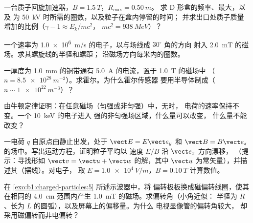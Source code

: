 \begin{exercise}[$\star\star$]\label{exo:b1:charged-particles:7}
一台质子回旋加速器，$B = \qty{1.5}{T}$，$R_{\max} = \qty{0.50}{m}$。
求 D 形盒的频率、最大，以及
为 \qty{50}{kV} 时所需的圈数，以及粒子在盒内停留的时间；
并求出口处质子质量增加的比例（$\gamma - 1 \approx E_k/mc^2$，
$mc^2 = \qty{938}{MeV}$）？
\end{exercise}

\begin{exercise}[$\star\star$]\label{exo:b1:charged-particles:8}
一个速率为 \qty{1.0e6}{m/s} 的电子，以与场线成 $30^\circ$ 角的方向
射入 \qty{2.0}{mT} 的磁场。求其螺旋线的半径和螺距；
沿磁场方向每米内的圈数。
\end{exercise}

\begin{exercise}[$\star\star$]\label{exo:b1:charged-particles:9}
一厚度为 \qty{1.0}{mm} 的铜带通有 \qty{5.0}{A} 的电流，置于 \qty{1.0}{T} 的磁场中
（$n = \qty{8.5e28}{m^{-3}}$）。求霍尔。为什么霍尔传感器
要用半导体制成（$n \sim \qty{1e22}{m^{-3}}$）？
\end{exercise}

\begin{exercise}[$\star\star\star$]\label{exo:b1:charged-particles:10}
由牛顿定律证明：在任意磁场（匀强或非匀强）中，无时，
电荷的速率保持不变。一个 \qty{10}{keV} 的电子进入
强的非匀强场区域，什么量可以改变，
什么量不能改变？
\end{exercise}

\begin{exercise}[$\star\star\star$]\label{exo:b1:charged-particles:11}
一电荷 $q$ 自原点由静止出发，处于 $\vect E = E\vect e_y$ 和
$\vect B = B\vect e_z$ 的场中。写出运动方程，证明粒子平均以
速度 $E/B$ 沿 $\vect e_x$ 方向漂移，
（提示：寻找形如 $\vect v = \vect u + \vect w$ 的解，其中
$\vect u$ 为常矢量），并描述其（摆线）。对电子，
取 $E = \qty{1.0e4}{V/m}$，$B = \qty{0.10}{T}$ 计算数值。
\end{exercise}

\begin{exercise}[$\star\star\star$]\label{exo:b1:charged-particles:12}
在 \cref{exo:b1:charged-particles:5} 所述示波器中，将
偏转极板换成磁偏转线圈，使其在相同的
\qty{4.0}{cm} 范围内产生 \qty{1.0}{mT} 的磁场。求偏转角（小角近似：
半径为 $R$、长为 $L$ 的圆弧），以及屏幕上的偏移量。为什么
电视显像管的偏转角较大，
却采用磁偏转而非电偏转？
\end{exercise}

